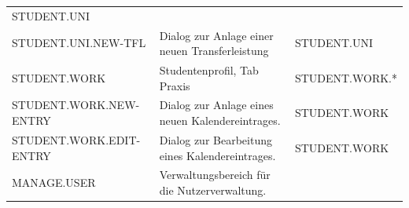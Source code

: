 \documentclass[
  12pt,
  ngerman,
  a4paper,
]{article}
\begin{document}
\begin{longtable}[]{@{}lll@{}}
\begin{minipage}[t]{0.28\columnwidth}
STUDENT.UNI\strut
\end{minipage}\tabularnewline
\begin{minipage}[t]{0.27\columnwidth}\raggedright
STUDENT.UNI.NEW-TFL\strut
\end{minipage} & \begin{minipage}[t]{0.35\columnwidth}\raggedright
Dialog zur Anlage einer neuen Transferleistung\strut
\end{minipage} & \begin{minipage}[t]{0.28\columnwidth}\raggedright
STUDENT.UNI\strut
\end{minipage}\tabularnewline
\begin{minipage}[t]{0.27\columnwidth}\raggedright
STUDENT.WORK\strut
\end{minipage} & \begin{minipage}[t]{0.35\columnwidth}\raggedright
Studentenprofil, Tab Praxis\strut
\end{minipage} & \begin{minipage}[t]{0.28\columnwidth}\raggedright
STUDENT.WORK.*\strut
\end{minipage}\tabularnewline
\begin{minipage}[t]{0.27\columnwidth}\raggedright
STUDENT.WORK.NEW-ENTRY\strut
\end{minipage} & \begin{minipage}[t]{0.35\columnwidth}\raggedright
Dialog zur Anlage eines neuen Kalendereintrages.\strut
\end{minipage} & \begin{minipage}[t]{0.28\columnwidth}\raggedright
STUDENT.WORK\strut
\end{minipage}\tabularnewline
\begin{minipage}[t]{0.27\columnwidth}\raggedright
STUDENT.WORK.EDIT-ENTRY\strut
\end{minipage} & \begin{minipage}[t]{0.35\columnwidth}\raggedright
Dialog zur Bearbeitung eines Kalendereintrages.\strut
\end{minipage} & \begin{minipage}[t]{0.28\columnwidth}\raggedright
STUDENT.WORK\strut
\end{minipage}\tabularnewline
\begin{minipage}[t]{0.27\columnwidth}\raggedright
MANAGE.USER\strut
\end{minipage} & \begin{minipage}[t]{0.35\columnwidth}\raggedright
Verwaltungsbereich für die Nutzerverwaltung.\strut
\end{minipage} & \begin{minipage}[t]{0.28\columnwidth}\raggedright

\end{minipage}
\end{longtable}
\end{document}
